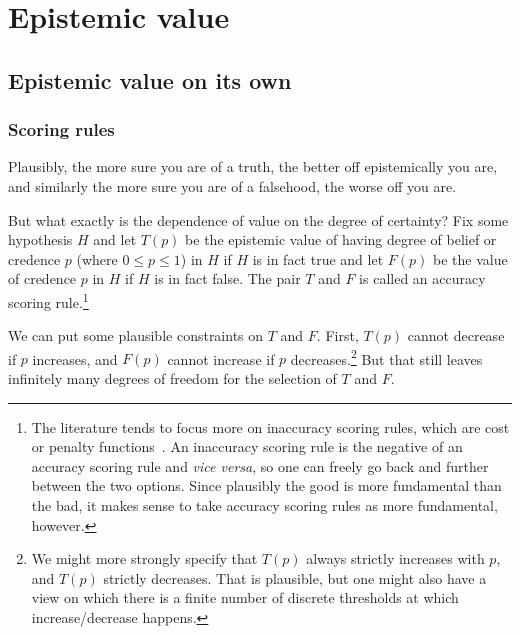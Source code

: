 \section{Epistemic value}\label{sec:epistemic-value}
\subsection{Epistemic value on its own}
\subsubsection{Scoring rules}\label{sec:scoring-rules}
Plausibly, the more sure you are of a truth, the better off epistemically you are, and similarly the more sure you are
of a falsehood, the worse off you are. 

But what exactly is the dependence of value on the degree of certainty? Fix some hypothesis $H$ and let $T(p)$ be the epistemic value of 
having degree of belief or credence $p$ (where $0\le p\le 1$) in $H$ if $H$ is in fact true and let $F(p)$ be the value of credence
$p$ in $H$ if $H$ is in fact false. The pair $T$ and $F$ is called an accuracy scoring rule.\footnote{The literature
tends to focus more on inaccuracy scoring rules, which are cost or penalty functions~\parencite{PreddEtAl}. 
An inaccuracy scoring rule is the negative of an accuracy scoring rule and \textit{vice versa}, so one can freely
go back and further between the two options. Since plausibly the good is more fundamental than the bad, it makes sense
to take accuracy scoring rules as more fundamental, however.}

We can put some plausible constraints on $T$ and $F$. First, $T(p)$ cannot decrease if $p$ increases,
and $F(p)$ cannot increase if $p$ decreases.\footnote{We might more strongly specify that $T(p)$ always strictly increases with $p$, and $T(p)$
strictly decreases. That is
plausible, but one might also have a view on which there is a finite number of discrete thresholds at which increase/decrease happens.}
But that still leaves infinitely many degrees of freedom for the selection of $T$ and $F$.

